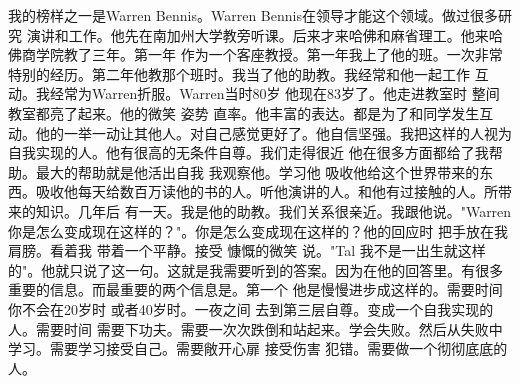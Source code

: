 我的榜样之一是Warren Bennis。Warren Bennis在领导才能这个领域。做过很多研究 演讲和工作。他先在南加州大学教旁听课。后来才来哈佛和麻省理工。他来哈佛商学院教了三年。第一年 作为一个客座教授。第一年我上了他的班。一次非常特别的经历。第二年他教那个班时。我当了他的助教。我经常和他一起工作 互动。我经常为Warren折服。Warren当时80岁 他现在83岁了。他走进教室时 整间教室都亮了起来。他的微笑 姿势 直率。他丰富的表达。都是为了和同学发生互动。他的一举一动让其他人。对自己感觉更好了。他自信坚强。我把这样的人视为自我实现的人。他有很高的无条件自尊。我们走得很近 他在很多方面都给了我帮助。最大的帮助就是他活出自我 我观察他。学习他 吸收他给这个世界带来的东西。吸收他每天给数百万读他的书的人。听他演讲的人。和他有过接触的人。所带来的知识。几年后 有一天。我是他的助教。我们关系很亲近。我跟他说。"Warren 你是怎么变成现在这样的？"。你是怎么变成现在这样的？他的回应时 把手放在我肩膀。看着我 带着一个平静。接受 慷慨的微笑 说。"Tal 我不是一出生就这样的"。他就只说了这一句。这就是我需要听到的答案。因为在他的回答里。有很多重要的信息。而最重要的两个信息是。第一个 他是慢慢进步成这样的。需要时间 你不会在20岁时 或者40岁时。一夜之间 去到第三层自尊。变成一个自我实现的人。需要时间 需要下功夫。需要一次次跌倒和站起来。学会失败。然后从失败中学习。需要学习接受自己。需要敞开心扉 接受伤害 犯错。需要做一个彻彻底底的人。 

